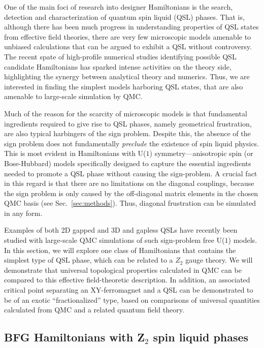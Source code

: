 \documentclass[10pt,pre,aps,twocolumn,showpacs,subscriptaddresses,floatfix]{revtex4}
\begin{document}
One of the main foci of research into designer Hamiltonians is the search, detection and characterization of quantum spin liquid (QSL) phases.  That is, although there 
has been much progress in understanding properties of QSL states from effective field theories, there are very few microscopic models amenable to unbiased calculations 
that can be argued to exhibit a QSL without controversy. The recent spate of high-profile numerical studies identifying possible QSL candidate Hamiltonians \cite{Yan,Meng10,J1J2} 
has sparked intense activities on the theory side, highlighting the synergy between analytical theory and numerics. Thus, we are interested in finding the simplest models 
harboring QSL states, that are also amenable to large-scale simulation by QMC.

Much of the reason for the scarcity of microscopic models is that fundamental ingredients required to give rise to QSL phases, namely geometrical frustration, are also typical 
harbingers of the sign problem.  Despite this, the absence of the sign problem does not fundamentally {\it preclude} the existence of spin liquid physics.  This is most evident 
in Hamiltonians with U($1$) symmetry---anisotropic spin (or Bose-Hubbard) models specifically designed to capture the essential ingredients needed to promote a QSL phase without 
causing the sign-problem. A crucial fact in this regard is that there are no limitations on the diagonal couplings, because the sign problem is only caused by the off-diagonal
matrix elements in the chosen QMC basis (see Sec.~\ref{sec:methods}). Thus, diagonal frustration can be simulated in any form.

Examples of both 2D gapped \cite{Isakov1,Isakov2,Long,TopoEE} and 3D and gapless \cite{Isakov3} QSLs have recently been studied with large-scale QMC simulations of 
such sign-problem free U($1$) models. In this section, we will explore one class of Hamiltonians that contains the simplest type of QSL phase, which can be related to a 
$Z_2$ gauge theory. We will demonstrate that universal topological properties calculated in QMC can be compared to this effective field-theoretic description.  
In addition, an associated critical point separating an XY-ferromagnet and a QSL can be demonstrated to be of an exotic ``fractionalized'' type, based on comparisons of 
universal quantities calculated from QMC and a related quantum field theory.

\subsection{BFG Hamiltonians with Z$_2$ spin liquid phases}
\end{document}
